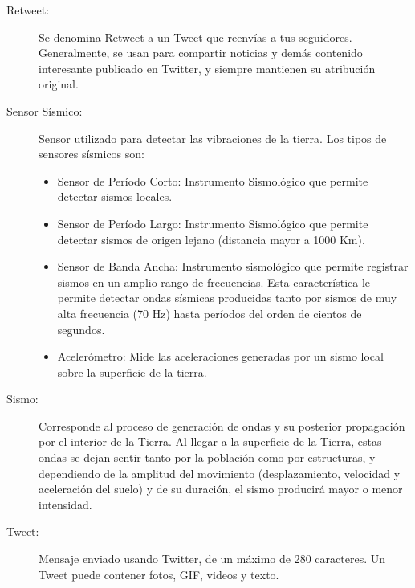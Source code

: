 \begin{description}
\item[Retweet:] Se denomina Retweet a un Tweet que reenvías a tus seguidores. Generalmente, se usan para compartir noticias y demás contenido interesante publicado en Twitter, y siempre mantienen su atribución original.\cite{twitterglosary}

\item[Sensor Sísmico:] Sensor utilizado para detectar las vibraciones de la tierra.\cite{csnglosary} Los tipos de sensores sísmicos son:
	\begin{itemize}
	\item Sensor de Período Corto: Instrumento Sismológico que permite detectar sismos locales.
	\item Sensor de Período Largo: Instrumento Sismológico que permite detectar sismos de origen lejano (distancia mayor a 1000 Km).
	\item Sensor de Banda Ancha: Instrumento sismológico que permite registrar sismos en un amplio rango de frecuencias. Esta característica le permite detectar ondas sísmicas producidas tanto por sismos de muy alta frecuencia (70 Hz) hasta períodos del orden de cientos de segundos.
	\item Acelerómetro: Mide las aceleraciones generadas por un sismo local sobre la superficie de la tierra.
	\end{itemize}
	
\item[Sismo:] Corresponde al proceso de generación de ondas y su posterior propagación por el interior de la Tierra. Al llegar a la superficie de la Tierra, estas ondas se dejan sentir tanto por la población como por estructuras, y dependiendo de la amplitud del movimiento (desplazamiento, velocidad y aceleración del suelo) y de su duración, el sismo producirá mayor o menor intensidad.\cite{csnglosary}

\item[Tweet:] Mensaje enviado usando Twitter, de un máximo de 280 caracteres. Un Tweet puede contener fotos, GIF, videos y texto.\cite{twitterglosary}

\end{description}


